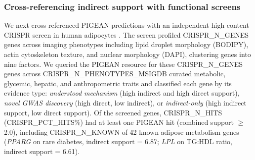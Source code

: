 

\subsubsection{Cross-referencing indirect support with functional screens}

We next cross-referenced PIGEAN predictions with an independent high-content CRISPR screen in human adipocytes \cite{flannick_adipocyte_2024}. The screen profiled {{CRISPR_N_GENES}} genes across imaging phenotypes including lipid droplet morphology (BODIPY), actin cytoskeleton texture, and nuclear morphology (DAPI), clustering genes into nine factors. We queried the PIGEAN resource for these {{CRISPR_N_GENES}} genes across {{CRISPR_N_PHENOTYPES_MSIGDB}} curated metabolic, glycemic, hepatic, and anthropometric traits and classified each gene by its evidence type: \textit{understood mechanism} (high indirect and high direct support), \textit{novel GWAS discovery} (high direct, low indirect), or \textit{indirect-only} (high indirect support, low direct support). Of the screened genes, {{CRISPR_N_HITS}} ({{CRISPR_PCT_HITS}}\%) had at least one PIGEAN hit (combined support $\geq$ 2.0), including {{CRISPR_N_KNOWN}} of 42 known adipose-metabolism genes (\textit{PPARG} on rare diabetes, indirect support = 6.87; \textit{LPL} on TG:HDL ratio, indirect support = 6.61).


